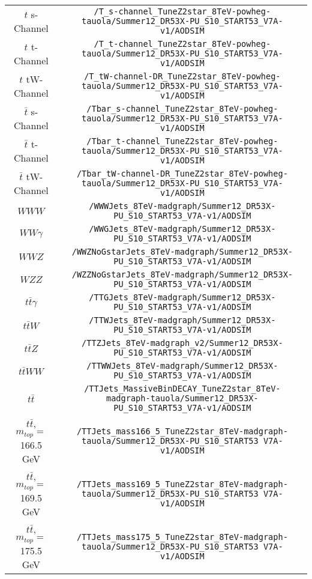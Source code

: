 \begin{sidewaystable}
\begin{tabular}{c|c}
\hline 
$t$ s-Channel & \verb+/T_s-channel_TuneZ2star_8TeV-powheg-tauola/Summer12_DR53X-PU_S10_START53_V7A-v1/AODSIM+ \\
$t$ t-Channel & \verb+/T_t-channel_TuneZ2star_8TeV-powheg-tauola/Summer12_DR53X-PU_S10_START53_V7A-v1/AODSIM+ \\
$t$ tW-Channel & \verb+/T_tW-channel-DR_TuneZ2star_8TeV-powheg-tauola/Summer12_DR53X-PU_S10_START53_V7A-v1/AODSIM+ \\
$\bar{t}$ s-Channel & \verb+/Tbar_s-channel_TuneZ2star_8TeV-powheg-tauola/Summer12_DR53X-PU_S10_START53_V7A-v1/AODSIM+ \\
$\bar{t}$ t-Channel & \verb+/Tbar_t-channel_TuneZ2star_8TeV-powheg-tauola/Summer12_DR53X-PU_S10_START53_V7A-v1/AODSIM+ \\
$\bar{t}$ tW-Channel & \verb+/Tbar_tW-channel-DR_TuneZ2star_8TeV-powheg-tauola/Summer12_DR53X-PU_S10_START53_V7A-v1/AODSIM+ \\
\hline 
$WWW$ & \verb+/WWWJets_8TeV-madgraph/Summer12_DR53X-PU_S10_START53_V7A-v1/AODSIM+ \\
$WW\gamma$ & \verb+/WWGJets_8TeV-madgraph/Summer12_DR53X-PU_S10_START53_V7A-v1/AODSIM+ \\
$WWZ$ & \verb+/WWZNoGstarJets_8TeV-madgraph/Summer12_DR53X-PU_S10_START53_V7A-v1/AODSIM+ \\
$WZZ$ & \verb+/WZZNoGstarJets_8TeV-madgraph/Summer12_DR53X-PU_S10_START53_V7A-v1/AODSIM+ \\
$t\bar{t}\gamma$ & \verb+/TTGJets_8TeV-madgraph/Summer12_DR53X-PU_S10_START53_V7A-v1/AODSIM+ \\
$t\bar{t}W$ & \verb+/TTWJets_8TeV-madgraph/Summer12_DR53X-PU_S10_START53_V7A-v1/AODSIM+ \\
$t\bar{t}Z$ & \verb+/TTZJets_8TeV-madgraph_v2/Summer12_DR53X-PU_S10_START53_V7A-v1/AODSIM+ \\
$t\bar{t}WW$ & \verb+/TTWWJets_8TeV-madgraph/Summer12_DR53X-PU_S10_START53_V7A-v1/AODSIM+ \\
\hline 
$t\bar{t}$ & \verb+/TTJets_MassiveBinDECAY_TuneZ2star_8TeV-madgraph-tauola/Summer12_DR53X-PU_S10_START53_V7A-v1/AODSIM+ \\
$t\bar{t}$, $m_{top} =$ 166.5 GeV & \verb+/TTJets_mass166_5_TuneZ2star_8TeV-madgraph-tauola/Summer12_DR53X-PU_S10_START53 V7A-v1/AODSIM+ \\
$t\bar{t}$, $m_{top} =$ 169.5 GeV & \verb+/TTJets_mass169_5_TuneZ2star_8TeV-madgraph-tauola/Summer12_DR53X-PU_S10_START53 V7A-v1/AODSIM+ \\
$t\bar{t}$, $m_{top} =$ 175.5 GeV & \verb+/TTJets_mass175_5_TuneZ2star_8TeV-madgraph-tauola/Summer12_DR53X-PU_S10_START53 V7A-v1/AODSIM+ \\

\end{tabular}
\end{sidewaystable}
